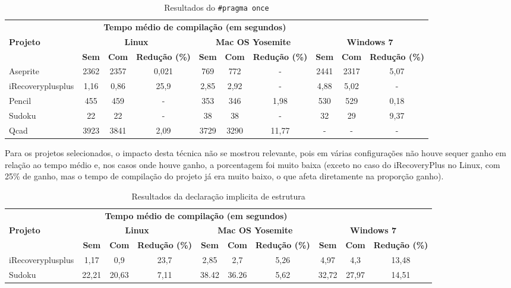 \begin{table}[!ht]
\tiny
\centering
\caption{Resultados do \texttt{\#pragma once}}
\label{tab:pragma}
\begin{tabular}{lccccccccc}
& \multicolumn{6}{c}{\textbf{Tempo médio de compilação (em segundos)} } \\
\textbf{Projeto} & \multicolumn{3}{c}{\textbf{Linux}} & \multicolumn{3}{c}{\textbf{Mac OS Yosemite}} & \multicolumn{3}{c}{\textbf{Windows 7}} \\ 
& \textbf{Sem } & \textbf{Com }  & \textbf{Redução (\%)} & \textbf{Sem } & \textbf{Com }  & \textbf{Redução (\%)} & \textbf{Sem } & \textbf{Com }  & \textbf{Redução (\%)} \\
\toprule
Aseprite & 2362 &  2357 & 0,021     & 769  & 772 &   - &  2441 & 2317 & 5,07 \\
iRecoveryplusplus & 1,16 & 0,86     & 25,9 & 2,85 & 2,92 & - & 4,88     & 5,02 & - \\
Pencil & 455  &  459  &  - &  353   & 346  & 1,98 &  530      & 529 &  0,18 \\
Sudoku & 22   &  22   &  - &  38    & 38   & -  &  32 & 29 & 9,37 \\ 
Qcad   & 3923 &  3841 &  2,09  &  3729  & 3290 & 11,77   & - & -  & - \\ 
\end{tabular}
\end{table}

Para os projetos selecionados, o impacto desta técnica não se mostrou relevante, pois em várias configurações não houve sequer ganho em relação ao tempo médio e, nos casos onde
houve ganho, a porcentagem foi muito baixa (exceto no caso do iRecoveryPlus no Linux, com 25\% de ganho, mas o tempo de compilação do projeto já era muito baixo, o que afeta diretamente 
na proporção ganho).

\begin{table}[!ht]
\tiny
\centering
\caption{Resultados da declaração implicita de estrutura}
\label{tab:forward_declaration}
\begin{tabular}{lccccccccc}
& \multicolumn{6}{c}{\textbf{Tempo médio de compilação (em segundos)} } \\
\textbf{Projeto} & \multicolumn{3}{c}{\textbf{Linux}} & \multicolumn{3}{c}{\textbf{Mac OS Yosemite}} & \multicolumn{3}{c}{\textbf{Windows 7}} \\ 
& \textbf{Sem } & \textbf{Com }  & \textbf{Redução (\%)} & \textbf{Sem } & \textbf{Com }  & \textbf{Redução (\%)} & \textbf{Sem } & \textbf{Com }  & \textbf{Redução (\%)} \\
\toprule
iRecoveryplusplus &   1,17  &   0,9  & 23,7 &   2,85 &  2,7 & 5,26 &  4,97 & 4,3 & 13,48 \\
Sudoku   & 22,21  & 20,63   & 7,11  &  38.42  & 36.26  & 5,62 & 32,72 & 27,97 & 14,51  \\ 
\end{tabular}
\end{table}

